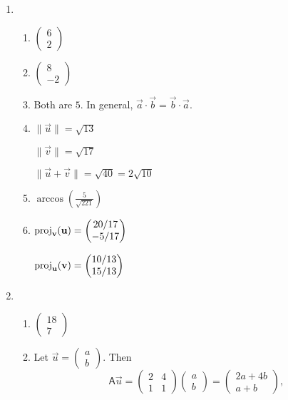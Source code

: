 \begin{enumerate}
\item \begin{enumerate}
\item $\begin{pmatrix} 6 \\ 2 \end{pmatrix}$
\item $\begin{pmatrix} 8 \\ -2 \end{pmatrix}$
\item Both are $5$. In general, $\vec{a}\cdot\vec{b} = \vec{b}\cdot\vec{a}$.
\item $\|\vec{u}\| = \sqrt{13}$\par
$\|\vec{v}\| = \sqrt{17}$\par
$\|\vec{u} + \vec{v}\| = \sqrt{40} = 2\sqrt{10}$
\item $\arccos\left(\frac{5}{\sqrt{221}}\right)$
\item $\operatorname{proj}_{\mathbf{v}}(\mathbf{u}) = \begin{pmatrix} 20/17 \\ -5/17 \end{pmatrix}$\par
$\operatorname{proj}_{\mathbf{u}}(\mathbf{v}) = \begin{pmatrix} 10/13 \\ 15/13 \end{pmatrix}$
\end{enumerate}
\item \begin{enumerate}
\item $\begin{pmatrix} 18 \\ 7 \end{pmatrix}$
\item Let $\vec{u} = \begin{pmatrix} a \\ b \end{pmatrix}$. Then
\begin{equation*}
\mathsf{A}\vec{u} = \begin{pmatrix} 2 & 4 \\ 1 & 1 \end{pmatrix}\begin{pmatrix} a \\ b \end{pmatrix} = \begin{pmatrix} 2a + 4b \\ a + b \end{pmatrix},

\end{equation*}
\end{enumerate}
\end{enumerate}
